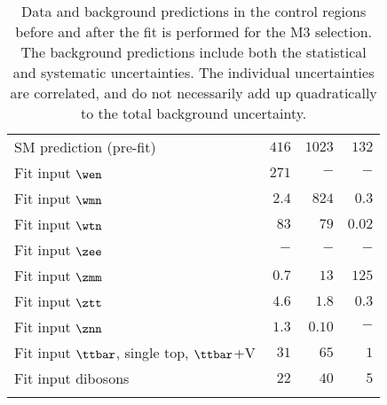 \begin{table}[!ht]
\begin{center}
{\begin{tabular*}{\textwidth}{@{\extracolsep{\fill}}lrrr}
    SM prediction (pre-fit)             & $416$          & $1023$          & $132$              \\
    \noalign{\smallskip}\hline\noalign{\smallskip}
    Fit input $\wen$          & $271$          & $-$          & $-$              \\
    Fit input $\wmn$          & $2.4$          & $824$          & $0.3$              \\
    Fit input $\wtn$          & $83$          & $79$          & $0.02$              \\
    Fit input $\zee$          & $-$          & $-$          & $-$              \\
    Fit input $\zmm$          & $0.7$          & $13$          & $125$              \\
    Fit input $\ztt$          & $4.6$          & $1.8$          & $0.3$              \\
    Fit input $\znn$          & $1.3$          & $0.10$          & $-$              \\
    Fit input $\ttbar$, single top, $\ttbar$+V         & $31$          & $65$          & $1$              \\
    Fit input dibosons          & $22$          & $40$          & $5$              \\
    \noalign{\smallskip}\hline\noalign{\smallskip}
  \end{tabular*}
}
\end{center}
\caption{Data and background predictions in the control regions before and after the fit is performed for the M3 selection.
  The background predictions include both the statistical and systematic uncertainties.
    The individual uncertainties are correlated, and do not necessarily add up
    quadratically to the total background uncertainty.}
    \label{tab:ControlRegion_M3}
    \end{table}
